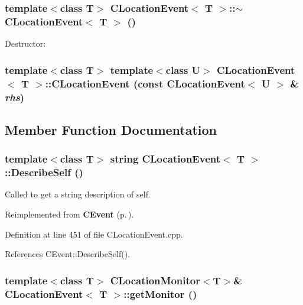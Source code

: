 \subsubsection{\setlength{\rightskip}{0pt plus 5cm}template$<$class T$>$ CLocation\-Event$<$ T $>$::$\sim$CLocation\-Event$<$ T $>$ ()}\label{classCLocationEvent_a3}


Destructor: 
\subsubsection{\setlength{\rightskip}{0pt plus 5cm}template$<$class T$>$ template$<$class U$>$ CLocation\-Event$<$ T $>$::CLocation\-Event (const CLocation\-Event$<$ U $>$ \& {\em rhs})\hspace{0.3cm}{\tt  [private]}}\label{classCLocationEvent_c0}




\subsection{Member Function Documentation}
\subsubsection{\setlength{\rightskip}{0pt plus 5cm}template$<$class T$>$ string CLocation\-Event$<$ T $>$::Describe\-Self ()\hspace{0.3cm}{\tt  [virtual]}}\label{classCLocationEvent_a10}


Called to get a string description of self. 

Reimplemented from {\bf CEvent} {\rm (p.\,\pageref{classCEvent_a16})}.

Definition at line 451 of file CLocation\-Event.cpp.

References CEvent::Describe\-Self().
\subsubsection{\setlength{\rightskip}{0pt plus 5cm}template$<$class T$>$ {\bf CLocation\-Monitor}$<$T$>$\& CLocation\-Event$<$ T $>$::get\-Monitor ()\hspace{0.3cm}{\tt  [inline]}}\label{classCLocationEvent_a4}


